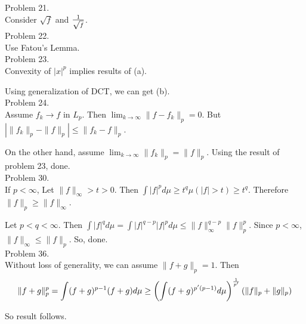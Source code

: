Problem 21. \\

Consider $\sqrt{f}$ and ${1\over \sqrt{f}}$. \\

Problem 22. \\

Use Fatou's Lemma. \\

Problem 23. \\

Convexity of $|x|^p$ implies results of (a).

Using generalization of DCT, we can get (b). \\

Problem 24. \\

Assume $f_k \rightarrow f$ in $L_p$. Then $\lim_{k\rightarrow \infty} \| f-f_k \|_p = 0$. But $| \|f_k \|_p - \|f \|_p | \leq \|f_k - f \|_p$. 

On the other hand, assume $\lim_{k\rightarrow \infty}\|f_k\|_p = \|f\|_p$. Using the result of problem 23, done. \\

Problem 30. \\

If $p < \infty$, Let $\|f \|_{\infty} > t > 0$. Then $\int |f|^p d\mu \geq t^q \mu\left( |f| > t \right) \geq t^q$. Therefore $\| f \|_p \geq \|f \|_{\infty}$. 

Let $p < q < \infty$. Then $\int |f|^q d\mu = \int |f|^{q-p} |f|^p d\mu \leq \|f\|_{\infty}^{q-p} \|f\|_{p}^p$. Since $p < \infty$, $\| f \| _{\infty} \leq \|f \|_p$. So, done. \\

Problem 36. \\

Without loss of generality, we can assume $\| f+g \|_p =1$. Then
\begin{equation}
	\|f+g\|_p^p = \int (f+g)^{p-1}(f+g)d\mu \geq \left( \int (f+g)^{p'(p-1)}d\mu \right)^{1\over p'}\left( \|f\|_p + \|g\|_p \right)
	\label{<+label+>}
\end{equation}

So result follows. \\


